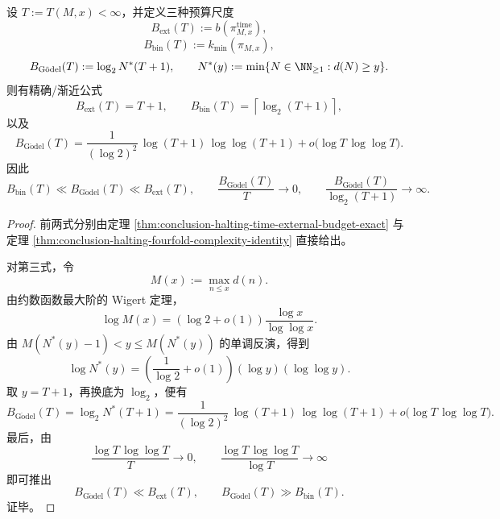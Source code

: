 \begin{theorem}\label{thm:conclusion-halting-time-three-scale-separation}
设 \(T:=T(M,x)<\infty\)，并定义三种预算尺度
\[
B_{\mathrm{ext}}(T):=b\!\left(\pi^{\mathrm{time}}_{M,x}\right),
\]
\[
B_{\mathrm{bin}}(T):=k_{\min}(\pi_{M,x}),
\]
\[
B_{\mathrm{G\ddot odel}}(T):=\log_2 N^\ast(T+1),
\qquad
N^\ast(y):=\min\{N\in\NN_{\ge 1}: d(N)\ge y\}.
\]
则有精确/渐近公式
\[
B_{\mathrm{ext}}(T)=T+1,
\qquad
B_{\mathrm{bin}}(T)=\left\lceil \log_2(T+1)\right\rceil,
\]
以及
\[
B_{\mathrm{G\ddot odel}}(T)
=
\frac{1}{(\log 2)^2}\,\log(T+1)\,\log\log(T+1)
+o\!\bigl(\log T\,\log\log T\bigr).
\]
因此
\[
B_{\mathrm{bin}}(T)\ll B_{\mathrm{G\ddot odel}}(T)\ll B_{\mathrm{ext}}(T),
\qquad
\frac{B_{\mathrm{G\ddot odel}}(T)}{T}\to 0,
\qquad
\frac{B_{\mathrm{G\ddot odel}}(T)}{\log_2(T+1)}\to\infty.
\]
\end{theorem}
\begin{proof}
前两式分别由定理 \ref{thm:conclusion-halting-time-external-budget-exact} 与定理 \ref{thm:conclusion-halting-fourfold-complexity-identity} 直接给出。

对第三式，令
\[
M(x):=\max_{n\le x} d(n).
\]
由约数函数最大阶的 Wigert 定理，
\[
\log M(x)=\left(\log 2+o(1)\right)\frac{\log x}{\log\log x}.
\]
由 \(M(N^\ast(y)-1)<y\le M(N^\ast(y))\) 的单调反演，得到
\[
\log N^\ast(y)
=
\left(\frac{1}{\log 2}+o(1)\right)(\log y)(\log\log y).
\]
取 \(y=T+1\)，再换底为 \(\log_2\)，便有
\[
B_{\mathrm{G\ddot odel}}(T)
=
\log_2 N^\ast(T+1)
=
\frac{1}{(\log 2)^2}\,\log(T+1)\,\log\log(T+1)
+o\!\bigl(\log T\,\log\log T\bigr).
\]
最后，由
\[
\frac{\log T\,\log\log T}{T}\to 0,
\qquad
\frac{\log T\,\log\log T}{\log T}\to\infty
\]
即可推出
\[
B_{\mathrm{G\ddot odel}}(T)\ll B_{\mathrm{ext}}(T),
\qquad
B_{\mathrm{G\ddot odel}}(T)\gg B_{\mathrm{bin}}(T).
\]
证毕。
\end{proof}

\endinput
